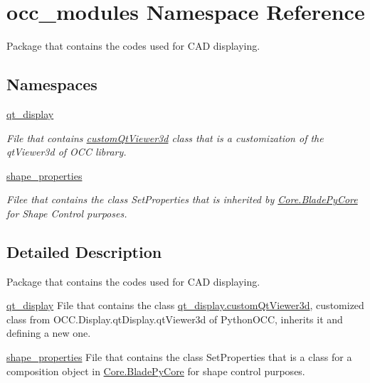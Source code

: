 \hypertarget{a00054}{}\section{occ\+\_\+modules Namespace Reference}
\label{a00054}


Package that contains the codes used for C\+AD displaying.  


\subsection*{Namespaces}
\begin{DoxyCompactItemize}
\item 
 \hyperlink{a00055}{qt\+\_\+display}
\begin{DoxyCompactList}\small\item\em File that contains \hyperlink{a00090}{custom\+Qt\+Viewer3d} class that is a customization of the qt\+Viewer3d of O\+CC library. \end{DoxyCompactList}\item 
 \hyperlink{a00056}{shape\+\_\+properties}
\begin{DoxyCompactList}\small\item\em Filee that contains the class Set\+Properties that is inherited by \hyperlink{a00078}{Core.\+Blade\+Py\+Core} for Shape Control purposes. \end{DoxyCompactList}\end{DoxyCompactItemize}


\subsection{Detailed Description}
Package that contains the codes used for C\+AD displaying. 

\begin{DoxyItemize}
\item {\ttfamily \hyperlink{a00055}{qt\+\_\+display}} File that contains the class \hyperlink{a00090}{qt\+\_\+display.\+custom\+Qt\+Viewer3d}, customized class from O\+C\+C.\+Display.\+qt\+Display.\+qt\+Viewer3d of Python\+O\+CC, inherits it and defining a new one.\end{DoxyItemize}
\begin{DoxyItemize}
\item {\ttfamily \hyperlink{a00056}{shape\+\_\+properties}} File that contains the class Set\+Properties that is a class for a composition object in \hyperlink{a00078}{Core.\+Blade\+Py\+Core} for shape control purposes. \end{DoxyItemize}
